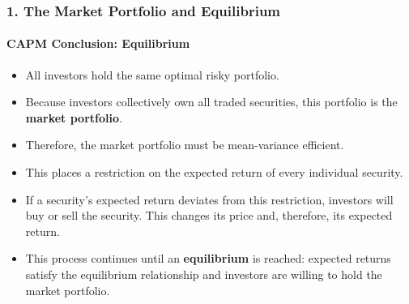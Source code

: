 \documentclass{beamer}
\begin{document}
\begin{frame}[t]
    \frametitle{1. The Market Portfolio and Equilibrium}
    \framesubtitle{CAPM Conclusion: Equilibrium}

        \begin{itemize}
            \item All investors hold the same optimal risky portfolio.
            
            \item Because investors collectively own all traded securities, this
            portfolio is the \textbf{market portfolio}.
            
            \item Therefore, the market portfolio must be mean-variance efficient.
            
            \item This places a restriction on the expected return of every
            individual security.
            
            \item If a security's expected return deviates from this restriction,
            investors will buy or sell the security. This changes its price and,
            therefore, its expected return.
            
            \item This process continues until an \textbf{equilibrium} is reached:
            expected returns satisfy the equilibrium relationship and investors
            are willing to hold the market portfolio.
        \end{itemize}


\end{frame}
\end{document}
